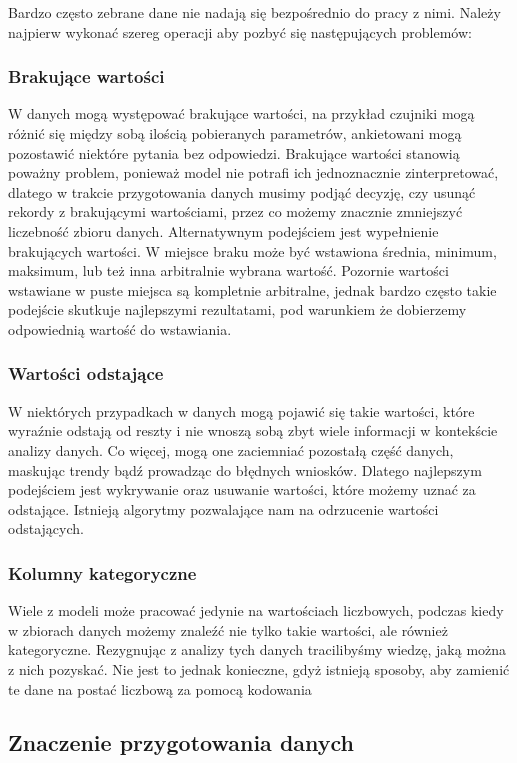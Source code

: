 \documentclass{article}
\begin{document}
Bardzo często zebrane dane nie nadają się bezpośrednio do pracy z nimi. Należy najpierw wykonać szereg operacji aby pozbyć się następujących problemów:   
\subsubsection{Brakujące wartości}
W danych mogą występować brakujące wartości, na przykład czujniki mogą różnić się między sobą ilością pobieranych parametrów, ankietowani mogą pozostawić niektóre pytania bez odpowiedzi. 
Brakujące wartości stanowią poważny problem, ponieważ model nie potrafi ich jednoznacznie zinterpretować, dlatego w trakcie przygotowania danych musimy podjąć decyzję, czy usunąć rekordy z brakującymi wartościami, 
przez co możemy znacznie zmniejszyć liczebność zbioru danych. Alternatywnym podejściem jest wypełnienie brakujących wartości. W miejsce braku może być wstawiona średnia, minimum, maksimum, lub też inna arbitralnie wybrana wartość. 
Pozornie wartości wstawiane w puste miejsca są kompletnie arbitralne, jednak bardzo często takie podejście skutkuje najlepszymi rezultatami, pod warunkiem że dobierzemy odpowiednią wartość do wstawiania. 
\subsubsection{Wartości odstające}
W niektórych przypadkach w danych mogą pojawić się takie wartości, 
które wyraźnie odstają od reszty i nie wnoszą sobą zbyt wiele informacji w kontekście analizy danych. 
Co więcej, mogą one zaciemniać pozostałą część danych, 
maskując trendy bądź prowadząc do błędnych wniosków. Dlatego najlepszym podejściem jest wykrywanie oraz usuwanie wartości, które możemy uznać za odstające. 
Istnieją algorytmy pozwalające nam na odrzucenie wartości odstających.
\subsubsection{Kolumny kategoryczne}
Wiele z modeli może pracować jedynie na wartościach liczbowych, podczas kiedy w zbiorach danych możemy znaleźć nie tylko takie wartości, ale również kategoryczne. Rezygnując z analizy tych danych tracilibyśmy wiedzę, jaką można z nich pozyskać. Nie jest to jednak konieczne, gdyż istnieją sposoby, aby zamienić te dane na postać liczbową za pomocą kodowania

\subsection{Znaczenie przygotowania danych}
\end{document}
